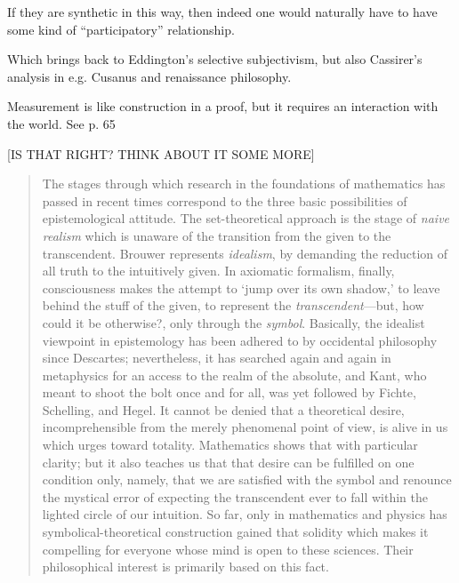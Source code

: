 If they are synthetic in this way, then indeed one would naturally have to have some kind of ``participatory'' relationship.

Which brings back to Eddington's selective subjectivism, but also Cassirer's analysis in e.g. Cusanus and renaissance philosophy.  

Measurement is like construction in a proof, but it requires an interaction with the world. See p. 65 \citep[p. 65]{Weyl1949}

[IS THAT RIGHT? THINK ABOUT IT SOME MORE]

\begin{quote}
    The stages through which research in the foundations of mathematics has passed in recent times correspond to the three basic possibilities of epistemological attitude.  The set-theoretical approach is the stage of \emph{naive realism} which is unaware of the transition from the given to the transcendent.  Brouwer represents \emph{idealism}, by demanding the reduction of all truth to the intuitively given.  In axiomatic formalism, finally, consciousness makes the attempt to `jump over its own shadow,' to leave behind the stuff of the given, to represent the \emph{transcendent}---but, how could it be otherwise?, only through the \emph{symbol}.  Basically, the idealist viewpoint in epistemology has been adhered to by occidental philosophy since Descartes; nevertheless, it has searched again and again in metaphysics for an access to the realm of the absolute, and Kant, who meant to shoot the bolt once and for all, was yet followed by Fichte, Schelling, and Hegel.  It cannot be denied that a theoretical desire, incomprehensible from the merely phenomenal point of view, is alive in us which urges toward totality. Mathematics shows that with particular clarity; but it also teaches us that that desire can be fulfilled on one condition only, namely, that we are satisfied with the symbol and renounce the mystical error of expecting the transcendent ever to fall within the lighted circle of our intuition.  So far, only in mathematics and physics has symbolical-theoretical construction gained that solidity which makes it compelling for everyone whose mind is open to these sciences.  Their philosophical interest is primarily based on this fact.

    \citep[p. 65-66]{Weyl1949}
\end{quote}


